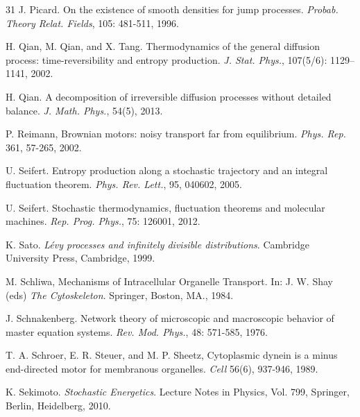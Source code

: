 \documentclass[10pt]{article}
\theoremstyle{definition}
\numberwithin{equation}{section}
\begin{document}
\begin{thebibliography}{31}
 J. Picard. On the existence of smooth densities for jump processes. {\it Probab. Theory Relat. Fields}, 105: 481-511, 1996.

 H. Qian, M. Qian, and X. Tang. Thermodynamics of the general diffusion process: time-reversibility and entropy production. {\it J. Stat. Phys.}, 107(5/6): 1129--1141, 2002.

 H. Qian. A decomposition of irreversible diffusion processes without detailed balance. {\it J. Math. Phys.}, 54(5), 2013.

P. Reimann,
Brownian motors: noisy transport far from equilibrium.
\textit{Phys. Rep.} 361, 57-265, 2002.

 U. Seifert. Entropy production along a stochastic trajectory and an integral fluctuation theorem. {\it Phys. Rev. Lett.}, 95, 040602, 2005.

 U. Seifert. Stochastic thermodynamics, fluctuation theorems and molecular machines. {\it Rep. Prog. Phys.}, 75: 126001, 2012.

 K. Sato. {\it L\'{e}vy processes and infinitely divisible distributions}. Cambridge University Press, Cambridge, 1999.



M. Schliwa,
Mechanisms of Intracellular Organelle Transport.
In: J. W. Shay (eds) \textit{The Cytoskeleton}.
Springer, Boston, MA., 1984.

 J. Schnakenberg. Network theory of microscopic and macroscopic behavior of master equation systems. {\it Rev. Mod. Phys.}, 48: 571-585, 1976.

T. A. Schroer, E. R. Steuer, and M. P. Sheetz,
Cytoplasmic dynein is a minus end-directed motor for membranous organelles.
\textit{Cell} 56(6), 937-946, 1989.

 K. Sekimoto. {\it Stochastic Energetics}. Lecture Notes in Physics, Vol. 799, Springer, Berlin, Heidelberg, 2010.


\end{thebibliography}
\end{document}
